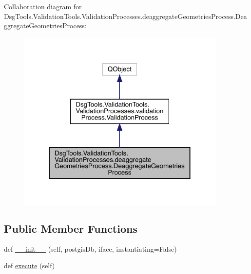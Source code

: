 Collaboration diagram for Dsg\+Tools.\+Validation\+Tools.\+Validation\+Processes.\+deaggregate\+Geometries\+Process.\+Deaggregate\+Geometries\+Process\+:
\nopagebreak
\begin{figure}[H]
\begin{center}
\leavevmode
\includegraphics[width=296pt]{class_dsg_tools_1_1_validation_tools_1_1_validation_processes_1_1deaggregate_geometries_process_070a20ecf447fdfbf431b681696869bc}
\end{center}
\end{figure}
\subsection*{Public Member Functions}
\begin{DoxyCompactItemize}
\item 
def \mbox{\hyperlink{class_dsg_tools_1_1_validation_tools_1_1_validation_processes_1_1deaggregate_geometries_process_f80917ef3b04cd8dc841b918110d01db_a5d5624dcdb4fa4374f660c9e6929a1fc}{\+\_\+\+\_\+init\+\_\+\+\_\+}} (self, postgis\+Db, iface, instantiating=False)
\item 
def \mbox{\hyperlink{class_dsg_tools_1_1_validation_tools_1_1_validation_processes_1_1deaggregate_geometries_process_f80917ef3b04cd8dc841b918110d01db_adf0b20ea240f41fe1477e52cc0b5f421}{execute}} (self)
\end{DoxyCompactItemize}
